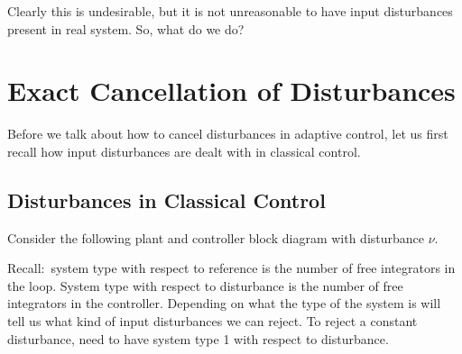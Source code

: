 Clearly this is undesirable, but it is not unreasonable to have input disturbances present in real system.
So, what do we do?

\section{Exact Cancellation of Disturbances}

Before we talk about how to cancel disturbances in adaptive control, let us first recall how input disturbances are dealt with in classical control.

\subsection{Disturbances in Classical Control}

Consider the following plant and controller block diagram with disturbance $\nu$.

\begin{figure}[H]
  \begin{center}
  \end{center}
\end{figure}

Recall:\ system type with respect to reference is the number of free integrators in the loop.
System type with respect to disturbance is the number of free integrators in the controller.
Depending on what the type of the system is will tell us what kind of input disturbances we can reject.
To reject a constant disturbance, need to have system type 1 with respect to disturbance.

